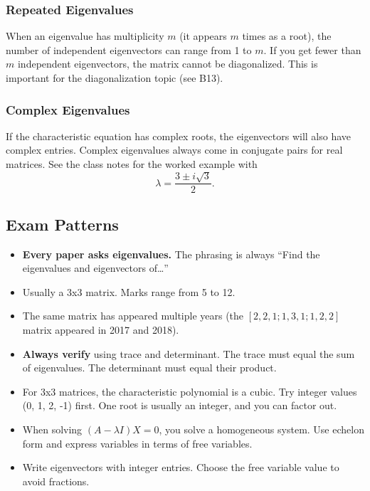\documentclass[
]{article}
\providecommand{\tightlist}{%
  \setlength{\itemsep}{0pt}\setlength{\parskip}{0pt}}
\begin{document}
\subsubsection{Repeated Eigenvalues}\label{repeated-eigenvalues}

When an eigenvalue has multiplicity \(m\) (it appears \(m\) times as a
root), the number of independent eigenvectors can range from 1 to \(m\).
If you get fewer than \(m\) independent eigenvectors, the matrix cannot
be diagonalized. This is important for the diagonalization topic (see
B13).

\subsubsection{Complex Eigenvalues}\label{complex-eigenvalues}

If the characteristic equation has complex roots, the eigenvectors will
also have complex entries. Complex eigenvalues always come in conjugate
pairs for real matrices. See the class notes for the worked example with
\[
\lambda = \frac{3 \pm i\sqrt{3}}{2}.
\]

\subsection{Exam Patterns}\label{exam-patterns-25}

\begin{itemize}
\tightlist
\item
  \textbf{Every paper asks eigenvalues.} The phrasing is always ``Find
  the eigenvalues and eigenvectors of\ldots{}''
\item
  Usually a 3x3 matrix. Marks range from 5 to 12.
\item
  The same matrix has appeared multiple years (the
  \([2,2,1; 1,3,1; 1,2,2]\) matrix appeared in 2017 and 2018).
\item
  \textbf{Always verify} using trace and determinant. The trace must
  equal the sum of eigenvalues. The determinant must equal their
  product.
\item
  For 3x3 matrices, the characteristic polynomial is a cubic. Try
  integer values (0, 1, 2, -1) first. One root is usually an integer,
  and you can factor out.
\item
  When solving \((A - \lambda I)X = 0\), you solve a homogeneous system.
  Use echelon form and express variables in terms of free variables.
\item
  Write eigenvectors with integer entries. Choose the free variable
  value to avoid fractions.
\end{itemize}
\end{document}
